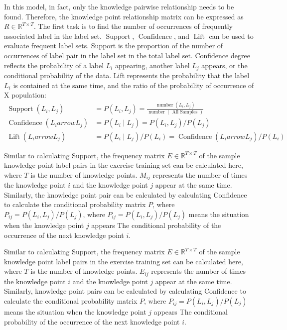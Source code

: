 In this model, in fact, only the knowledge pairwise relationship needs to be found. Therefore, the knowledge point relationship matrix can be expressed as \(R\in \mathbb{R}^{T\times T}\). The first task is to find the number of occurrences of frequently associated label in the label set. \(\operatorname{Support}\), \(\operatorname{Confidence}\), and \(\operatorname{Lift}\) can be used to evaluate frequent label sets. Support is the proportion of the number of occurrences of label pair in the label set in the total label set. Confidence degree reflects the probability of a label \(L_i\) appearing, another label \(L_j\) appears, or the conditional probability of the data. Lift represents the probability that the label \(L_i\) is contained at the same time, and the ratio of the probability of occurrence of X population:
\begin{align}
	\operatorname{Support}(L_i, L_j)         & =P(L_i,L_j)=\frac{\operatorname{number}(L_i,L_j)}{\operatorname{number}(\text{ All Samples })} \\
	\operatorname{Confidence}(L_i arrow L_j) & =P(L_i \mid L_j)=P(L_i, L_j) / P(L_j)                                                          \\
	\operatorname{Lift}(L_i arrow L_j)       & =P(L_i \mid L_j) / P(L_i)=\operatorname{Confidence}(L_i arrow L_j) / P(L_i)
\end{align}

Similar to calculating Support, the frequency matrix \(E\in \mathbb{R}^{T\times T}\) of the sample knowledge point label pairs in the exercise training set can be calculated here, where \(T\) is the number of knowledge points. \(M_{ij}\) represents the number of times the knowledge point \(i\) and the knowledge point \(j\) appear at the same time. Similarly, the knowledge point pair can be calculated by calculating Confidence to calculate the conditional probability matrix \(P\), where \(P_{ij}=P(L_i, L_j)/P(L_j)\), where \(P_{ij}=P(L_i, L_j)/P(L_j)\) means the situation when the knowledge point \(j\) appears The conditional probability of the occurrence of the next knowledge point \(i\).

Similar to calculating Support, the frequency matrix \(E\in \mathbb{R}^{T\times T}\) of the sample knowledge point label pairs in the exercise training set can be calculated here, where \(T\) is the number of knowledge points. \(E_{ij}\) represents the number of times the knowledge point \(i\) and the knowledge point \(j\) appear at the same time. Similarly, knowledge point pairs can be calculated by calculating Confidence to calculate the conditional probability matrix \(P\), where \(P_{ij}=P(L_i, L_j)/P(L_j)\) means the situation when the knowledge point \(j\) appears The conditional probability of the occurrence of the next knowledge point \(i\).

